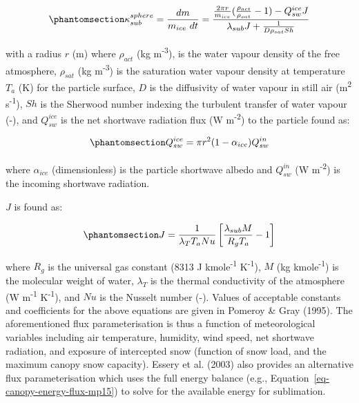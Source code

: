 \documentclass[
  letterpaper,
]{tex/uofsthesis-cs}
\begin{document}
\begin{equation}\phantomsection\label{eq-pom98-sublimation}{
\kappa_{sub}^{sphere} = \frac{dm}{m_{ice} \ dt} = \frac{
  \frac{2 \pi r}{m_{ice}} (\frac{\rho_{act}}{{\rho_{sat}}}-1) - Q_{sw}^{ice} J
}{
  \lambda_{sub} J + \frac{1}{D \rho_{sat} Sh}
}
}\end{equation}

with a radius \(r\) (m) where \(\rho_{act}\) (kg m\textsuperscript{-3}),
is the water vapour density of the free atmosphere, \(\rho_{sat}\) (kg
m\textsuperscript{-3}) is the saturation water vapour density at
temperature \(T_a\) (K) for the particle surface, \(D\) is the
diffusivity of water vapour in still air (m\textsuperscript{2}
s\textsuperscript{-1}), \(Sh\) is the Sherwood number indexing the
turbulent transfer of water vapour (-), and \(Q_{sw}^{ice}\) is the net
shortwave radiation flux (W m\textsuperscript{-2}) to the particle found
as:

\begin{equation}\phantomsection\label{eq-pom98-sw}{
Q_{sw}^{ice} = \pi r^2 (1-\alpha_{ice}) Q_{sw}^{in}
}\end{equation}

where \(\alpha_{ice}\) (dimensionless) is the particle shortwave albedo
and \(Q_{sw}^{in}\) (W m\textsuperscript{-2}) is the incoming shortwave
radiation.

\(J\) is found as:

\begin{equation}\phantomsection\label{eq-pom98-j}{
J = \frac{1}{\lambda_T T_a Nu} \left[ \frac{\lambda_{sub} M}{R_g T_a} -1 \right]
}\end{equation}

where \(R_g\) is the universal gas constant (8313 J
kmole\textsuperscript{-1} K\textsuperscript{-1}), \(M\) (kg
kmole\textsuperscript{-1}) is the molecular weight of water,
\(\lambda_T\) is the thermal conductivity of the atmosphere (W
m\textsuperscript{-1} K\textsuperscript{-1}), and \(Nu\) is the Nusselt
number (-). Values of acceptable constants and coefficients for the
above equations are given in Pomeroy \& Gray (1995). The aforementioned
flux parameterisation is thus a function of meteorological variables
including air temperature, humidity, wind speed, net shortwave
radiation, and exposure of intercepted snow (function of snow load, and
the maximum canopy snow capacity). Essery et al. (2003) also provides an
alternative flux parameterisation which uses the full energy balance
(e.g., Equation~\ref{eq-canopy-energy-flux-mp15}) to solve for the
available energy for sublimation.
\end{document}
